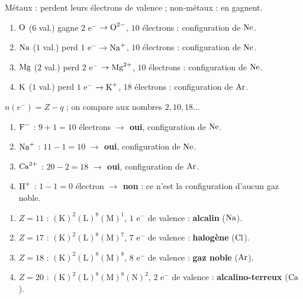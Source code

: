 \documentclass[11pt,a4paper]{article}
\begin{document}
\begin{corrige}
Métaux : perdent leurs électrons de valence ; non-métaux : en gagnent.
\begin{enumerate}[label=\alph*)]
  \item $\ce{O}$ ($6$ val.) gagne $2$ e$^-$ $\to \ce{O^{2-}}$, $10$ électrons : configuration de $\ce{Ne}$.
  \item $\ce{Na}$ ($1$ val.) perd $1$ e$^-$ $\to \ce{Na^{+}}$, $10$ électrons : configuration de $\ce{Ne}$.
  \item $\ce{Mg}$ ($2$ val.) perd $2$ e$^-$ $\to \ce{Mg^{2+}}$, $10$ électrons : configuration de $\ce{Ne}$.
  \item $\ce{K}$ ($1$ val.) perd $1$ e$^-$ $\to \ce{K^{+}}$, $18$ électrons : configuration de $\ce{Ar}$.
\end{enumerate}
\end{corrige}

\begin{corrige}
$n(e^-) = Z - q$ ; on compare aux nombres $2, 10, 18\dots$
\begin{enumerate}[label=\alph*)]
  \item $\ce{F^{-}}$ : $9+1 = 10$ électrons \textbf{\textcolor{excol}{$\to$ oui}}, configuration de $\ce{Ne}$.
  \item $\ce{Na^{+}}$ : $11-1 = 10$ \textbf{\textcolor{excol}{$\to$ oui}}, configuration de $\ce{Ne}$.
  \item $\ce{Ca^{2+}}$ : $20-2 = 18$ \textbf{\textcolor{excol}{$\to$ oui}}, configuration de $\ce{Ar}$.
  \item $\ce{H^{+}}$ : $1-1 = 0$ électron \textbf{\textcolor{attncol}{$\to$ non}} : ce n'est la
        configuration d'aucun gaz noble.
\end{enumerate}
\end{corrige}

\begin{corrige}
\begin{enumerate}[label=\alph*)]
  \item $Z=11$ : $(\mathrm{K})^2(\mathrm{L})^8(\mathrm{M})^1$, $1$ e$^-$ de valence : \textbf{alcalin} ($\ce{Na}$).
  \item $Z=17$ : $(\mathrm{K})^2(\mathrm{L})^8(\mathrm{M})^7$, $7$ e$^-$ de valence : \textbf{halogène} ($\ce{Cl}$).
  \item $Z=18$ : $(\mathrm{K})^2(\mathrm{L})^8(\mathrm{M})^8$, $8$ e$^-$ de valence : \textbf{gaz noble} ($\ce{Ar}$).
  \item $Z=20$ : $(\mathrm{K})^2(\mathrm{L})^8(\mathrm{M})^8(\mathrm{N})^2$, $2$ e$^-$ de valence :
        \textbf{alcalino-terreux} ($\ce{Ca}$).
\end{enumerate}
\end{corrige}
\end{document}
